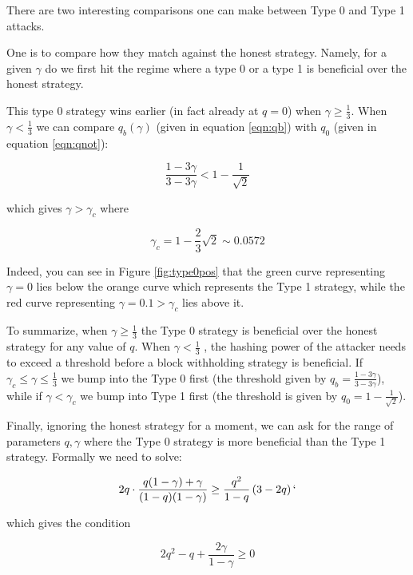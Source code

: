 \documentclass[letterpaper,12pt]{report}
\theoremstyle{plain}
\theoremstyle{definition}
\begin{document}
There are two interesting comparisons one can make between Type 0 and Type 1 attacks.

One is to compare how they match against the honest strategy. Namely, for a given $\gamma$ do we first hit the regime where a type 0 or a type 1 is beneficial over the honest strategy.

This type 0 strategy wins earlier (in fact already at $q=0$) when $\gamma\geq\frac{1}{3}$. When $\gamma < \frac{1}{3}$ we can compare $q_b(\gamma)$ (given in equation \ref{eqn:qb}) with $q_0$ (given in equation \ref{eqn:qnot}):

\begin{equation}\label{qbornot}
\dfrac{1-3\gamma}{3-3\gamma}<1-\dfrac{1}{\sqrt{2}}
\end{equation}

which gives $\gamma>\gamma_c$ where 

\begin{equation}\label{gamma0before1}
\gamma_c=1-\frac{2}{3}\sqrt{2}\sim 0.0572
\end{equation}

Indeed, you can see in Figure \ref{fig:type0pos} that the green curve representing $\gamma=0$ lies below the orange curve which represents the Type 1 strategy, while the red curve representing $\gamma=0.1>\gamma_c$ lies above it.

To summarize, when $\gamma\geq\frac{1}{3}$ the Type 0 strategy is beneficial over the honest strategy for any value of $q$. When $\gamma<\frac{1}{3}$ , the hashing power of the attacker needs to exceed a threshold before a block withholding strategy is beneficial. If $\gamma_c\leq\gamma\leq\frac{1}{3}$ we bump into the Type 0 first (the threshold given by $q_b=\frac{1-3\gamma}{3-3\gamma}$), while if $\gamma<\gamma_c$ we bump into Type 1 first (the threshold is given by $q_0=1-\frac{1}{\sqrt{2}}$).

Finally, ignoring the honest strategy for a moment, we can ask for the range of parameters $q,\gamma$ where the Type 0 strategy is more beneficial than the Type 1 strategy. Formally we need to solve:

\begin{equation}\label{eqn:type0overtype1}
2q\cdot\frac{q(1-\gamma)+\gamma}{(1-q)(1-\gamma)}\geq \dfrac{q^2}{1-q}\left(
3-2q
\right)`
\end{equation}

which gives the condition

\begin{equation}\label{eqn:type0over1condition}
2q^2-q+\frac{2\gamma}{1-\gamma}\geq 0
\end{equation}
\end{document}
